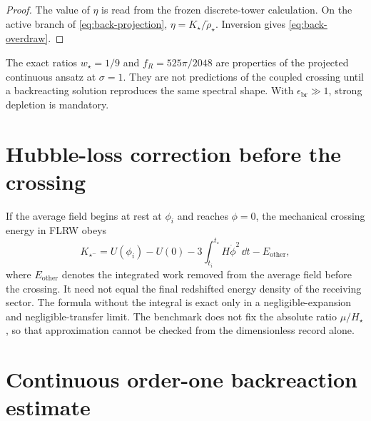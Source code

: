 \begin{proof}
The value of $\eta$ is read from the frozen discrete-tower calculation.  On the active branch of \eqref{eq:back-projection}, $\eta=K_\star/\widetilde\rho_\star$.  Inversion gives \eqref{eq:back-overdraw}.
\end{proof}

\begin{negativebox}
The exact ratios $w_\star=1/9$ and $f_R=525\pi/2048$ are properties of the projected continuous ansatz at $\sigma=1$.  They are not predictions of the coupled crossing until a backreacting solution reproduces the same spectral shape.  With $\epsilon_{\mathrm{br}}\gg1$, strong depletion is mandatory.
\end{negativebox}

\section{Hubble-loss correction before the crossing}

If the average field begins at rest at $\phi_i$ and reaches $\phi=0$, the mechanical crossing energy in FLRW obeys
\begin{equation}
\boxed{
K_{\star^-}
=U(\phi_i)-U(0)
-3\int_{t_i}^{t_\star}H\dot\phi^2\,\dd t
-E_{\mathrm{other}},}
\label{eq:back-hubble-loss}
\end{equation}
where $E_{\mathrm{other}}$ denotes the integrated work removed from the average field before the crossing.  It need not equal the final redshifted energy density of the receiving sector.  The formula without the integral is exact only in a negligible-expansion and negligible-transfer limit.  The benchmark does not fix the absolute ratio $\mu/H_\star$, so that approximation cannot be checked from the dimensionless record alone.

\section{Continuous order-one backreaction estimate}

